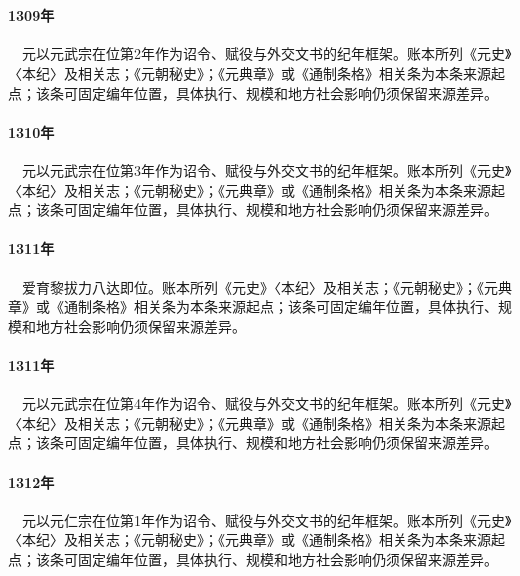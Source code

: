 \section{}

\paragraph{1309年}　元以元武宗在位第2年作为诏令、赋役与外交文书的纪年框架。账本所列《元史》〈本纪〉及相关志；《元朝秘史》；《元典章》或《通制条格》相关条为本条来源起点；该条可固定编年位置，具体执行、规模和地方社会影响仍须保留来源差异。

\paragraph{1310年}　元以元武宗在位第3年作为诏令、赋役与外交文书的纪年框架。账本所列《元史》〈本纪〉及相关志；《元朝秘史》；《元典章》或《通制条格》相关条为本条来源起点；该条可固定编年位置，具体执行、规模和地方社会影响仍须保留来源差异。

\paragraph{1311年}　爱育黎拔力八达即位。账本所列《元史》〈本纪〉及相关志；《元朝秘史》；《元典章》或《通制条格》相关条为本条来源起点；该条可固定编年位置，具体执行、规模和地方社会影响仍须保留来源差异。

\paragraph{1311年}　元以元武宗在位第4年作为诏令、赋役与外交文书的纪年框架。账本所列《元史》〈本纪〉及相关志；《元朝秘史》；《元典章》或《通制条格》相关条为本条来源起点；该条可固定编年位置，具体执行、规模和地方社会影响仍须保留来源差异。

\paragraph{1312年}　元以元仁宗在位第1年作为诏令、赋役与外交文书的纪年框架。账本所列《元史》〈本纪〉及相关志；《元朝秘史》；《元典章》或《通制条格》相关条为本条来源起点；该条可固定编年位置，具体执行、规模和地方社会影响仍须保留来源差异。

